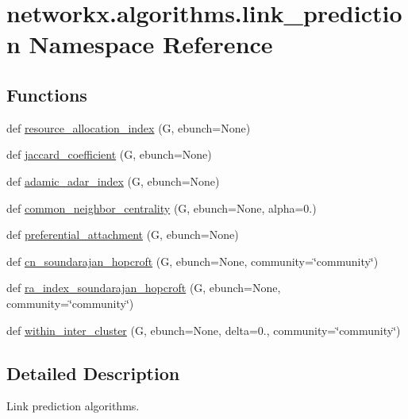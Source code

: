 \hypertarget{namespacenetworkx_1_1algorithms_1_1link__prediction}{}\section{networkx.\+algorithms.\+link\+\_\+prediction Namespace Reference}
\label{namespacenetworkx_1_1algorithms_1_1link__prediction}
\subsection*{Functions}
\begin{DoxyCompactItemize}
\item 
def \hyperlink{namespacenetworkx_1_1algorithms_1_1link__prediction_a2d04b0b73763f8f964ae0d251e536b31}{resource\+\_\+allocation\+\_\+index} (G, ebunch=None)
\item 
def \hyperlink{namespacenetworkx_1_1algorithms_1_1link__prediction_aafb6cb724a33fc47e2722a29aa23f65d}{jaccard\+\_\+coefficient} (G, ebunch=None)
\item 
def \hyperlink{namespacenetworkx_1_1algorithms_1_1link__prediction_a97e3c05fec4b4c2d20be81fb3e10ae5a}{adamic\+\_\+adar\+\_\+index} (G, ebunch=None)
\item 
def \hyperlink{namespacenetworkx_1_1algorithms_1_1link__prediction_a45713a94d1120e276cad7a7e636b7212}{common\+\_\+neighbor\+\_\+centrality} (G, ebunch=None, alpha=0.)
\item 
def \hyperlink{namespacenetworkx_1_1algorithms_1_1link__prediction_a424e20c04c0309c9486da83a51138d05}{preferential\+\_\+attachment} (G, ebunch=None)
\item 
def \hyperlink{namespacenetworkx_1_1algorithms_1_1link__prediction_a9c5018917b79b89c1f4ad087731d7f10}{cn\+\_\+soundarajan\+\_\+hopcroft} (G, ebunch=None, community=\char`\"{}community\char`\"{})
\item 
def \hyperlink{namespacenetworkx_1_1algorithms_1_1link__prediction_aec305e0e0ad608c561c6e51b358b1fb3}{ra\+\_\+index\+\_\+soundarajan\+\_\+hopcroft} (G, ebunch=None, community=\char`\"{}community\char`\"{})
\item 
def \hyperlink{namespacenetworkx_1_1algorithms_1_1link__prediction_a9b7af17cf19357c55684099957105c67}{within\+\_\+inter\+\_\+cluster} (G, ebunch=None, delta=0., community=\char`\"{}community\char`\"{})
\end{DoxyCompactItemize}


\subsection{Detailed Description}
\begin{DoxyVerb}Link prediction algorithms.
\end{DoxyVerb}
 


